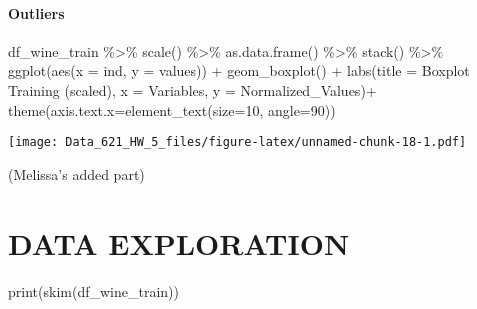 \documentclass[
]{article}
\newenvironment{Shaded}{\begin{snugshade}}{\end{snugshade}}
\newcommand{\AttributeTok}[1]{\textcolor[rgb]{0.77,0.63,0.00}{#1}}
\newcommand{\DecValTok}[1]{\textcolor[rgb]{0.00,0.00,0.81}{#1}}
\newcommand{\FunctionTok}[1]{\textcolor[rgb]{0.00,0.00,0.00}{#1}}
\newcommand{\NormalTok}[1]{#1}
\newcommand{\SpecialCharTok}[1]{\textcolor[rgb]{0.00,0.00,0.00}{#1}}
\newcommand{\StringTok}[1]{\textcolor[rgb]{0.31,0.60,0.02}{#1}}
\begin{document}
\hypertarget{outliers-1}{%
\paragraph{Outliers}\label{outliers-1}}

\begin{Shaded}
\begin{Highlighting}[]
\NormalTok{df\_wine\_train }\SpecialCharTok{\%\textgreater{}\%}
  \FunctionTok{scale}\NormalTok{() }\SpecialCharTok{\%\textgreater{}\%}
  \FunctionTok{as.data.frame}\NormalTok{() }\SpecialCharTok{\%\textgreater{}\%}
  \FunctionTok{stack}\NormalTok{() }\SpecialCharTok{\%\textgreater{}\%}
  \FunctionTok{ggplot}\NormalTok{(}\FunctionTok{aes}\NormalTok{(}\AttributeTok{x =}\NormalTok{ ind, }\AttributeTok{y =}\NormalTok{ values)) }\SpecialCharTok{+}
  \FunctionTok{geom\_boxplot}\NormalTok{() }\SpecialCharTok{+}
  \FunctionTok{labs}\NormalTok{(}\AttributeTok{title =} \StringTok{\textquotesingle{}Boxplot Training (scaled)\textquotesingle{}}\NormalTok{,}
       \AttributeTok{x =} \StringTok{\textquotesingle{}Variables\textquotesingle{}}\NormalTok{,}
       \AttributeTok{y =} \StringTok{\textquotesingle{}Normalized\_Values\textquotesingle{}}\NormalTok{)}\SpecialCharTok{+}
  \FunctionTok{theme}\NormalTok{(}\AttributeTok{axis.text.x=}\FunctionTok{element\_text}\NormalTok{(}\AttributeTok{size=}\DecValTok{10}\NormalTok{, }\AttributeTok{angle=}\DecValTok{90}\NormalTok{)) }
\end{Highlighting}
\end{Shaded}

\texttt{[image: Data\_621\_HW\_5\_files/figure-latex/unnamed-chunk-18-1.pdf]}

(Melissa's added part)

\hypertarget{data-exploration}{%
\section{DATA EXPLORATION}\label{data-exploration}}

\begin{Shaded}
\begin{Highlighting}[]
\FunctionTok{print}\NormalTok{(}\FunctionTok{skim}\NormalTok{(df\_wine\_train))}
\end{Highlighting}
\end{Shaded}
\end{document}
